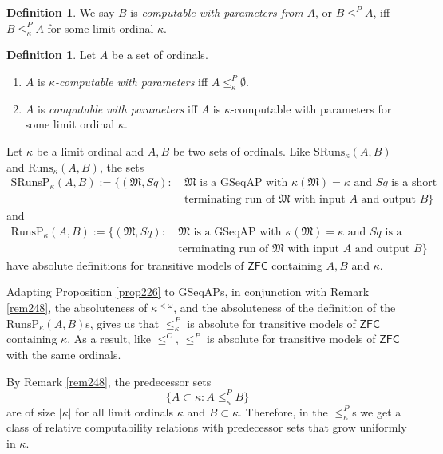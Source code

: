 \documentclass[12pt, twoside]{memoir}
\numberwithin{equation}{section}
\theoremstyle{definition}
\newtheorem{defi}[thm]{Definition}
\theoremstyle{remark}
\theoremstyle{definition}
\theoremstyle{definition}
\theoremstyle{definition}
\theoremstyle{remark}
\begin{document}
\begin{defi}\label{def839}
We say $B$ is \emph{computable with parameters from} $A$, or $B \leq^P A$, iff $B \leq^P_{\kappa} A$ for some limit ordinal $\kappa$.
\end{defi}

\begin{defi}
Let $A$ be a set of ordinals.
\begin{enumerate}[label=(\arabic*)]
    \item $A$ is $\kappa$\emph{-computable with parameters} iff $A \leq^P_{\kappa} \emptyset$.
    \item $A$ is \emph{computable with parameters} iff $A$ is $\kappa$-computable with parameters for some limit ordinal $\kappa$.
\end{enumerate}
\end{defi}

Let $\kappa$ be a limit ordinal and $A, B$ be two sets of ordinals. Like $\mathrm{SRuns}_{\kappa}(A, B)$ and $\mathrm{Runs}_{\kappa}(A, B)$, the sets
\begin{align*}
    \mathrm{SRunsP}_{\kappa}(A, B) := \{(\mathfrak{M}, Sq) : \ & \mathfrak{M} \text{ is a GSeqAP with } \kappa(\mathfrak{M}) = \kappa \text{ and } Sq \text{ is a short} \\
    & \text{terminating run of } \mathfrak{M} \text{ with input } A \text{ and output } B\}
\end{align*}
and
\begin{align*}
    \mathrm{RunsP}_{\kappa}(A, B) := \{(\mathfrak{M}, Sq) : \ & \mathfrak{M} \text{ is a GSeqAP with } \kappa(\mathfrak{M}) = \kappa \text{ and } Sq \text{ is a} \\
    & \text{terminating run of } \mathfrak{M} \text{ with input } A \text{ and output } B\}
\end{align*}
have absolute definitions for transitive models of $\mathsf{ZFC}$ containing $A, B$ and $\kappa$. 

Adapting Proposition \ref{prop226} to GSeqAPs, in conjunction with Remark \ref{rem248}, the absoluteness of $\kappa^{< \omega}$, and the absoluteness of the definition of the $\mathrm{RunsP}_{\kappa}(A, B)$s, gives us that $\leq^P_{\kappa}$ is absolute for transitive models of $\mathsf{ZFC}$ containing $\kappa$. As a result, like $\leq^C$, $\leq^P$ is absolute for transitive models of $\mathsf{ZFC}$ with the same ordinals. 

By Remark \ref{rem248}, the predecessor sets
\begin{equation*}
    \{A \subset \kappa : A \leq^P_{\kappa} B\}
\end{equation*}
are of size $|\kappa|$ for all limit ordinals $\kappa$ and $B \subset \kappa$. Therefore, in the $\leq^P_{\kappa}$s we get a class of relative computability relations with predecessor sets that grow uniformly in $\kappa$.
\end{document}

